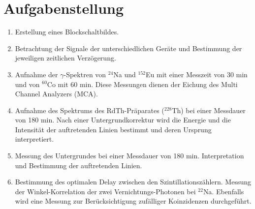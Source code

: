 \clearpage
\section{Aufgabenstellung}
\begin{enumerate}
 \item Erstellung eines Blockschaltbildes.\\
 \item Betrachtung der Signale der unterschiedlichen Geräte und Bestimmung der jeweiligen zeitlichen Verzögerung.\\
 \item Aufnahme der $\gamma$-Spektren von $^{24}{}$Na und $^{152}{}$Eu mit einer Messzeit von 30 min und von $^{60}{}$Co mit 60 min. Diese Messungen dienen der Eichung des Multi Channel Analyzers (MCA).\\
 \item Aufnahme des Spektrums des RdTh-Präparates ($^{228}{}$Th) bei einer Messdauer von 180 min. Nach einer Untergrundkorrektur wird die Energie und die Intensität der auftretenden Linien bestimmt und deren Ursprung interpretiert.\\
 \item Messung des Untergrundes bei einer Messdauer von 180 min. Interpretation und Bestimmung der auftretenden Linien.\\
 \item Bestimmung des optimalen Delay zwischen den Szintillationszählern. Messung der Winkel-Korrelation der zwei Vernichtungs-Photonen bei $^{22}{}$Na. Ebenfalls wird eine Messung zur Berücksichtigung zufälliger Koinzidenzen durchgeführt.
\end{enumerate}